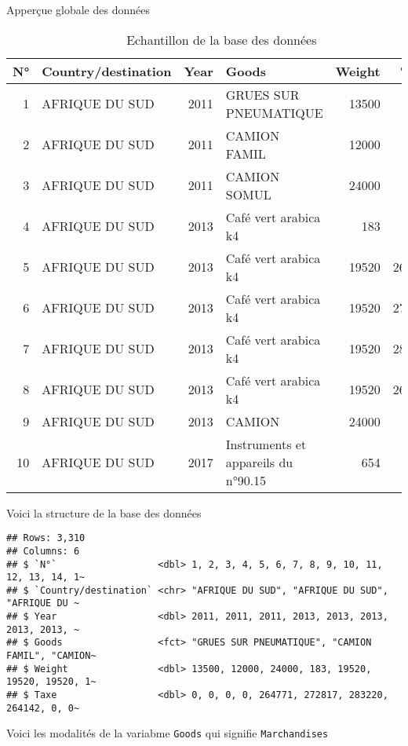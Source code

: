 \documentclass[
]{book}
\begin{document}
Apperçue globale des données

\begin{table}

\caption{\label{tab:unnamed-chunk-2}Echantillon de la base des données}
\centering
\begin{tabular}[t]{r|l|r|l|r|r}
\hline
N° & Country/destination & Year & Goods & Weight & Taxe\\
\hline
1 & AFRIQUE DU SUD & 2011 & GRUES SUR PNEUMATIQUE & 13500 & 0\\
\hline
2 & AFRIQUE DU SUD & 2011 & CAMION FAMIL & 12000 & 0\\
\hline
3 & AFRIQUE DU SUD & 2011 & CAMION SOMUL & 24000 & 0\\
\hline
4 & AFRIQUE DU SUD & 2013 & Café vert arabica k4 & 183 & 0\\
\hline
5 & AFRIQUE DU SUD & 2013 & Café vert arabica k4 & 19520 & 264771\\
\hline
6 & AFRIQUE DU SUD & 2013 & Café vert arabica k4 & 19520 & 272817\\
\hline
7 & AFRIQUE DU SUD & 2013 & Café vert arabica k4 & 19520 & 283220\\
\hline
8 & AFRIQUE DU SUD & 2013 & Café vert arabica k4 & 19520 & 264142\\
\hline
9 & AFRIQUE DU SUD & 2013 & CAMION & 24000 & 0\\
\hline
10 & AFRIQUE DU SUD & 2017 & Instruments et appareils du n°90.15 & 654 & 0\\
\hline
\end{tabular}
\end{table}

Voici la structure de la base des données

\begin{verbatim}
## Rows: 3,310
## Columns: 6
## $ `N°`                  <dbl> 1, 2, 3, 4, 5, 6, 7, 8, 9, 10, 11, 12, 13, 14, 1~
## $ `Country/destination` <chr> "AFRIQUE DU SUD", "AFRIQUE DU SUD", "AFRIQUE DU ~
## $ Year                  <dbl> 2011, 2011, 2011, 2013, 2013, 2013, 2013, 2013, ~
## $ Goods                 <fct> "GRUES SUR PNEUMATIQUE", "CAMION FAMIL", "CAMION~
## $ Weight                <dbl> 13500, 12000, 24000, 183, 19520, 19520, 19520, 1~
## $ Taxe                  <dbl> 0, 0, 0, 0, 264771, 272817, 283220, 264142, 0, 0~
\end{verbatim}

Voici les modalités de la variabme \texttt{Goods} qui signifie
\texttt{Marchandises}
\end{document}
